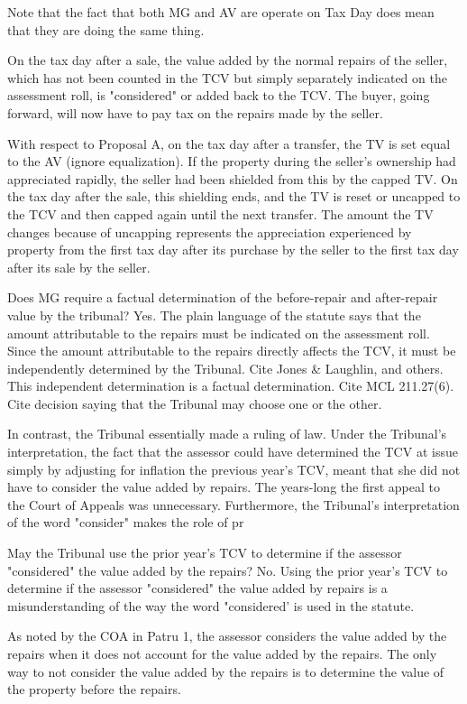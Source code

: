 \documentclass[12pt,\documentclassflag]{michiganCourtOfAppealsBrief}
\begin{document}
Note that the fact that both MG and AV are operate on Tax Day does mean that they are doing the same thing. 

On the tax day after a sale, the value added by the normal repairs of the seller, which has not been counted in the TCV but simply separately indicated on the assessment roll, is "considered" or added back to the TCV. The buyer, going forward, will now have to pay tax on the repairs made by the seller.

With respect to Proposal A, on the tax day after a transfer, the TV is set equal to the AV (ignore equalization). If the property during the seller's ownership had appreciated rapidly, the seller had been shielded from this by the capped TV. On the tax day after the sale, this shielding ends, and the TV is reset or uncapped to the TCV and then capped again until the next transfer. The amount the TV changes because of uncapping represents the appreciation experienced by property from the first tax day after its purchase by the seller to the first tax day after its sale by the seller.

Does MG require a factual determination of the before-repair and after-repair value by the tribunal? Yes. The plain language of the statute says that the amount attributable to the repairs must be indicated on the assessment roll. 
Since the amount attributable to the repairs directly affects the TCV, it must be independently determined by the Tribunal. Cite Jones & Laughlin, and others. 
This independent determination is a factual determination. Cite MCL 211.27(6). Cite decision saying that the Tribunal may choose one or the other. 

In contrast, the Tribunal essentially made a ruling of law. Under the Tribunal's interpretation, the fact that the assessor could have determined the TCV at issue simply by adjusting for inflation the previous year's TCV, meant that she did not have to consider the value added by repairs. The years-long the first appeal to the Court of Appeals was unnecessary. Furthermore, the Tribunal's interpretation of the word "consider" makes the role of pr

May the Tribunal use the prior year's TCV to determine if the assessor "considered" the value added by the repairs? No. Using the prior year's TCV to determine if the assessor "considered" the value added by repairs is a misunderstanding of the way the word "considered' is used in the statute. 

As noted by the COA in Patru 1, the assessor considers the value added by the repairs when it does not account for the value added by the repairs. The only way to not consider the value added by the repairs is to determine the value of the property before the repairs. 
\end{document}
